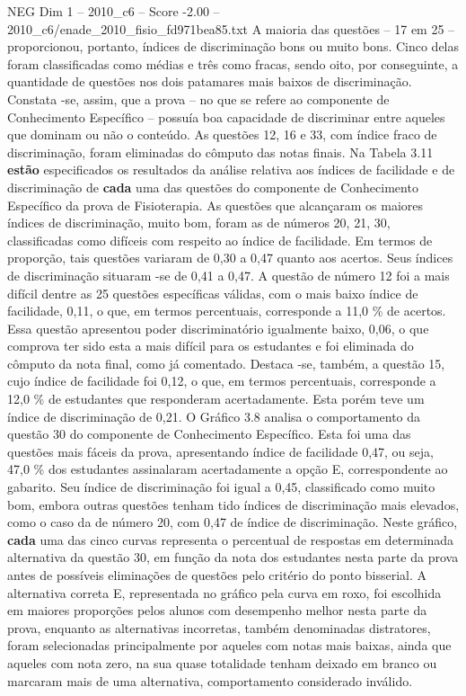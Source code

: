 \begin{textsample}{NEG Dim 1 – 2010\_c6 – Score -2.00 – 2010\_c6/enade\_2010\_fisio\_fd971bea85.txt}
A maioria das questões – 17 em 25 – proporcionou, portanto, índices de discriminação bons ou muito bons.
Cinco delas foram classificadas como médias e três como fracas, sendo oito, por conseguinte, a quantidade de questões nos dois patamares mais baixos de discriminação.
Constata -se, assim, que a prova – no que se refere ao componente de Conhecimento Específico – possuía boa capacidade de discriminar entre aqueles que dominam ou não o conteúdo.
As questões 12, 16 e 33, com índice fraco de discriminação, foram eliminadas do cômputo das notas finais.
Na Tabela 3.11 \textbf{estão} especificados os resultados da análise relativa aos índices de facilidade e de discriminação de \textbf{cada} uma das questões do componente de Conhecimento Específico da prova de Fisioterapia.
As questões que alcançaram os maiores índices de discriminação, muito bom, foram as de números 20, 21, 30, classificadas como difíceis com respeito ao índice de facilidade.
Em termos de proporção, tais questões variaram de 0,30 a 0,47 quanto aos acertos.
Seus índices de discriminação situaram -se de 0,41 a 0,47.
A questão de número 12 foi a mais difícil dentre as 25 questões específicas válidas, com o mais baixo índice de facilidade, 0,11, o que, em termos percentuais, corresponde a 11,0 \% de acertos.
Essa questão apresentou poder discriminatório igualmente baixo, 0,06, o que comprova ter sido esta a mais difícil para os estudantes e foi eliminada do cômputo da nota final, como já comentado.
Destaca -se, também, a questão 15, cujo índice de facilidade foi 0,12, o que, em termos percentuais, corresponde a 12,0 \% de estudantes que responderam acertadamente.
Esta porém teve um índice de discriminação de 0,21.
O Gráfico 3.8 analisa o comportamento da questão 30 do componente de Conhecimento Específico.
Esta foi uma das questões mais fáceis da prova, apresentando índice de facilidade 0,47, ou seja, 47,0 \% dos estudantes assinalaram acertadamente a opção E, correspondente ao gabarito.
Seu índice de discriminação foi igual a 0,45, classificado como muito bom, embora outras questões tenham tido índices de discriminação mais elevados, como o caso da de número 20, com 0,47 de índice de discriminação.
Neste gráfico, \textbf{cada} uma das cinco curvas representa o percentual de respostas em determinada alternativa da questão 30, em função da nota dos estudantes nesta parte da prova antes de possíveis eliminações de questões pelo critério do ponto bisserial.
A alternativa correta E, representada no gráfico pela curva em roxo, foi escolhida em maiores proporções pelos alunos com desempenho melhor nesta parte da prova, enquanto as alternativas incorretas, também denominadas distratores, foram selecionadas principalmente por aqueles com notas mais baixas, ainda que aqueles com nota zero, na sua quase totalidade tenham deixado em branco ou marcaram mais de uma alternativa, comportamento considerado inválido.

\end{textsample}
